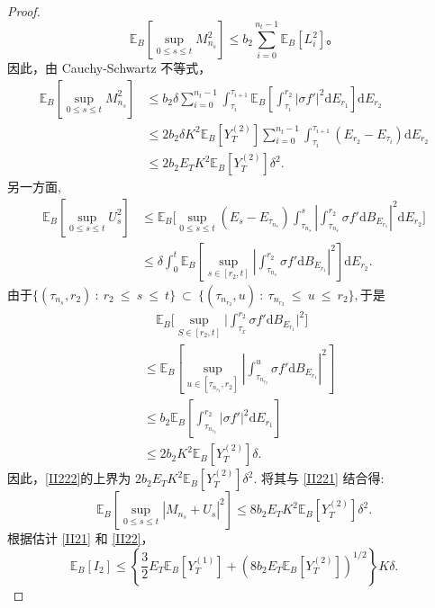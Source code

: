 \begin{proof}
	$$
	\mathbb{E}_B \left[\sup_{0 \leq s \leq t} M_{n_s}^2\right] \leq b_2 \sum_{i=0}^{n_t-1} \mathbb{E}_B [L_i^2]。
	$$
	因此，由 Cauchy-Schwartz 不等式，
	\begin{align}
		\mathbb{E}_B\left[\sup_{0\leq s\leq t}M_{n_s}^2\right] 
		&\leq b_2\delta\sum_{i=0}^{n_t-1}\int_{\tau_i}^{\tau_{i+1}}\mathbb{E}_B
		\left[\int_{\tau_i}^{r_2}\left|\sigma f'\right|^2\mathrm{d}E_{r_1}\right]
		\mathrm{d}E_{r_2} \nonumber \\
		&\leq2b_2\delta K^2\mathbb{E}_B[Y_T^{(2)}]\sum_{i=0}^{n_t-1}\int_{\tau_i}^
		{\tau_{i+1}}(E_{r_2}-E_{\tau_i})\mathrm{d}E_{r_2} \nonumber \\
		&\leq 2b_2E_TK^2\mathbb{E}_B[Y_T^{(2)}]\delta^2. \label{II221}
	\end{align}
	另一方面, 
	\begin{align}
		\mathbb{E}_B\left[\sup_{0\leq s\leq t}U_s^2\right]  
		&\leq\mathbb{E}_B\biggl[\sup_{0\leq s\leq t}(E_s-E_{\tau_{n_s}})\int_{\tau_{n_s}}^s\left|\int_{\tau_{n_s}}^{r_2}\sigma f'\mathrm{d}B_{E_{r_1}}\right|^2\mathrm{d}E_{r_2}\biggr] \nonumber \\ &\leq\delta\int_0^t\mathbb{E}_B\left[\sup_{s\in[r_2,t]}\left|\int_{\tau_{n_s}}^{r_2}\sigma f'\mathrm{d}B_{E_{r_1}}\right|^2\right]\mathrm{d}E_{r_2}.\label{II222}
	\end{align}
	由于$\{(\tau_{n_s},r_2)~:~r_2~\leq~s~\leq~t\}~\subset~\{(\tau_{n_{r_2}},u)~:~\tau_{n_{r_2}}~\leq~u~\leq~r_2\},$于是
	\begin{align*}
		&\quad\mathbb{E}_B\Big[\sup_{S\in[r_2,t]}\Big|\int_{\tau_x}^{r_2}\sigma f'\mathrm{d}B_{E_{r_1}}\Big|^2\Big]  \\
		&\le \mathbb{E}_B\left[\sup_{u\in[\tau_{n_{r_2}},r_2]}\left|\int_{\tau_{n_{r_2}}}^u\sigma f'\mathrm{d}B_{E_{r_1}}\right|^2\right] \\
		&\leq b_2\mathbb{E}_B\left[\int_{\tau_{n_{r_2}}}^{r_2}\left|\sigma f'\right|^2\mathrm{d}E_{r_1}\right]\\
		&\leq 2b_2K^2\mathbb{E}_B[Y_T^{(2)}]\delta.
	\end{align*}
	因此，\cref{II222}的上界为  $2b_2E_TK^2\mathbb{E}_B[Y_T^{(2)}]\delta^2.$ 将其与 \cref{II221} 结合得:
	\begin{equation}\label{II22}
		\mathbb{E}_B\left[\sup_{0\leq s\leq t}|M_{n_s}+U_s|^2\right] 
		\leq 8b_2E_TK^2\mathbb{E}_B[Y_T^{(2)}]\delta^2. 
	\end{equation}
	根据估计 \cref{II21} 和 \cref{II22}，
	\begin{equation}\label{II2}
		\mathbb{E}_B[I_2] 
		\leq \left\{\frac{3}{2}E_T\mathbb{E}_B[Y_T^{(1)}]+(8b_2E_T\mathbb{E}_B[Y_T^{(2)}])^{1/2}\right\}K\delta. 
	\end{equation}
	

\end{proof}
